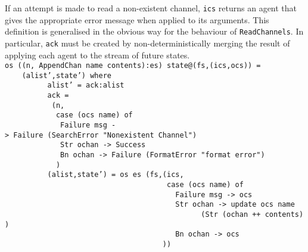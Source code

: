 If an attempt is made to read a non-existent channel, \mbox{\tt ics}
returns an agent that gives the appropriate error message when
applied to its arguments.  This definition is generalised in the
obvious way for the behaviour of \mbox{\tt ReadChannels}.  In particular, \mbox{\tt ack}
must be created by non-deterministically merging the result of applying
each agent to the stream of future states.
\bprog
\mbox{\tt os\ ((n,\ AppendChan\ name\ contents):es)\ state@(fs,(ics,ocs))\ =}\\
\mbox{\tt \ \ \ \ (alist',state')\ where}\\
\mbox{\tt \ \ \ \ \ \ \ \ \ \ alist'\ =\ ack:alist}\\
\mbox{\tt \ \ \ \ \ \ \ \ \ \ ack\ =}\\
\mbox{\tt \ \ \ \ \ \ \ \ \ \ \ (n,}\\
\mbox{\tt \ \ \ \ \ \ \ \ \ \ \ \ case\ (ocs\ name)\ of}\\
\mbox{\tt \ \ \ \ \ \ \ \ \ \ \ \ \ Failure\ msg\ ->\ Failure\ (SearchError\ "Nonexistent\ Channel")}\\
\mbox{\tt \ \ \ \ \ \ \ \ \ \ \ \ \ Str\ ochan\ ->\ Success}\\
\mbox{\tt \ \ \ \ \ \ \ \ \ \ \ \ \ Bn\ ochan\ ->\ Failure\ (FormatError\ "format\ error")}\\
\mbox{\tt \ \ \ \ \ \ \ \ \ \ \ \ )}\\
\mbox{\tt \ \ \ \ \ \ \ \ \ \ (alist,state')\ =\ os\ es\ (fs,(ics,}\\
\mbox{\tt \ \ \ \ \ \ \ \ \ \ \ \ \ \ \ \ \ \ \ \ \ \ \ \ \ \ \ \ \ \ \ \ \ \ \ \ \ \ case\ (ocs\ name)\ of}\\
\mbox{\tt \ \ \ \ \ \ \ \ \ \ \ \ \ \ \ \ \ \ \ \ \ \ \ \ \ \ \ \ \ \ \ \ \ \ \ \ \ \ \ \ Failure\ msg\ ->\ ocs}\\
\mbox{\tt \ \ \ \ \ \ \ \ \ \ \ \ \ \ \ \ \ \ \ \ \ \ \ \ \ \ \ \ \ \ \ \ \ \ \ \ \ \ \ \ Str\ ochan\ ->\ update\ ocs\ name}\\
\mbox{\tt \ \ \ \ \ \ \ \ \ \ \ \ \ \ \ \ \ \ \ \ \ \ \ \ \ \ \ \ \ \ \ \ \ \ \ \ \ \ \ \ \ \ \ \ \ \ (Str\ (ochan\ ++\ contents))}\\
\mbox{\tt \ \ \ \ \ \ \ \ \ \ \ \ \ \ \ \ \ \ \ \ \ \ \ \ \ \ \ \ \ \ \ \ \ \ \ \ \ \ \ \ Bn\ ochan\ ->\ ocs}\\
\mbox{\tt \ \ \ \ \ \ \ \ \ \ \ \ \ \ \ \ \ \ \ \ \ \ \ \ \ \ \ \ \ \ \ \ \ \ \ \ \ ))}
